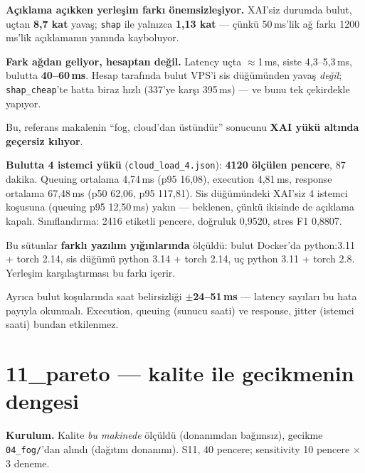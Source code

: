 \documentclass[11pt,a4paper]{report}
\newcommand{\ms}{\,ms}
\newcommand{\kod}[1]{\texttt{\small #1}}
\newcommand{\dosya}[1]{\texttt{\footnotesize #1}}
\begin{document}
\begin{bulgu}
\textbf{Açıklama açıkken yerleşim farkı önemsizleşiyor.} XAI'siz durumda bulut,
uçtan \textbf{8{,}7 kat} yavaş; \kod{shap} ile yalnızca \textbf{1{,}13 kat} ---
çünkü 50\ms'lik ağ farkı 1200\ms'lik açıklamanın yanında kayboluyor.

\textbf{Fark ağdan geliyor, hesaptan değil.} Latency uçta $\approx$1\ms, siste
4{,}3--5{,}3\ms, bulutta \textbf{40--60\ms}. Hesap tarafında bulut VPS'i sis
düğümünden yavaş \emph{değil}; \kod{shap\_cheap}'te hatta biraz hızlı
(337'ye karşı 395\ms) --- ve bunu tek çekirdekle yapıyor.

Bu, referans makalenin ``fog, cloud'dan üstündür'' sonucunu \textbf{XAI yükü
altında geçersiz kılıyor}.
\end{bulgu}

\textbf{Bulutta 4 istemci yükü} (\dosya{cloud\_load\_4.json}): \textbf{4120
ölçülen pencere}, 87 dakika. Queuing ortalama 4{,}74\ms{} (p95 16{,}08),
execution 4{,}81\ms, response ortalama 67{,}48\ms{} (p50 62{,}06, p95 117{,}81).
Sis düğümündeki XAI'siz 4 istemci koşusuna (queuing p95 12{,}50\ms) yakın ---
beklenen, çünkü ikisinde de açıklama kapalı. Sınıflandırma: 2416 etiketli
pencere, doğruluk 0{,}9520, stres F1 0{,}8807.

\begin{uyari}
Bu sütunlar \textbf{farklı yazılım yığınlarında} ölçüldü: bulut Docker'da
python:3.11 + torch 2.14, sis düğümü python 3.14 + torch 2.14, uç python 3.11 +
torch 2.8. Yerleşim karşılaştırması bu farkı içerir.

Ayrıca bulut koşularında saat belirsizliği \textbf{$\pm$24--51\ms} --- latency
sayıları bu hata payıyla okunmalı. Execution, queuing (sunucu saati) ve
response, jitter (istemci saati) bundan etkilenmez.
\end{uyari}

\section{11\_pareto --- kalite ile gecikmenin dengesi}

\textbf{Kurulum.} Kalite \emph{bu makinede} ölçüldü (donanımdan bağımsız),
gecikme \dosya{04\_fog/}'dan alındı (dağıtım donanımı). S11, 40 pencere;
sensitivity 10 pencere $\times$ 3 deneme.
\end{document}
